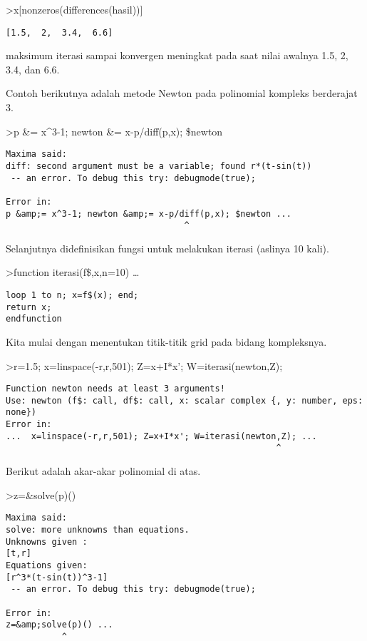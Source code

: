 \documentclass[
]{book}
\begin{document}
\textgreater x{[}nonzeros(differences(hasil)){]}

\begin{verbatim}
[1.5,  2,  3.4,  6.6]
\end{verbatim}

maksimum iterasi sampai konvergen meningkat pada saat nilai awalnya 1.5, 2, 3.4, dan 6.6.

Contoh berikutnya adalah metode Newton pada polinomial kompleks berderajat 3.

\textgreater p \&= x\^{}3-1; newton \&= x-p/diff(p,x); \$newton

\begin{verbatim}
Maxima said:
diff: second argument must be a variable; found r*(t-sin(t))
 -- an error. To debug this try: debugmode(true);

Error in:
p &amp;= x^3-1; newton &amp;= x-p/diff(p,x); $newton ...
                                   ^
\end{verbatim}

Selanjutnya didefinisikan fungsi untuk melakukan iterasi (aslinya 10 kali).

\textgreater function iterasi(f\$,x,n=10) \ldots{}

\begin{verbatim}
loop 1 to n; x=f$(x); end;
return x;
endfunction
\end{verbatim}

Kita mulai dengan menentukan titik-titik grid pada bidang kompleksnya.

\textgreater r=1.5; x=linspace(-r,r,501); Z=x+I*x'; W=iterasi(newton,Z);

\begin{verbatim}
Function newton needs at least 3 arguments!
Use: newton (f$: call, df$: call, x: scalar complex {, y: number, eps: none}) 
Error in:
...  x=linspace(-r,r,501); Z=x+I*x'; W=iterasi(newton,Z); ...
                                                     ^
\end{verbatim}

Berikut adalah akar-akar polinomial di atas.

\textgreater z=\&solve(p)()

\begin{verbatim}
Maxima said:
solve: more unknowns than equations.
Unknowns given :  
[t,r]
Equations given:  
[r^3*(t-sin(t))^3-1]
 -- an error. To debug this try: debugmode(true);

Error in:
z=&amp;solve(p)() ...
           ^
\end{verbatim}
\end{document}
